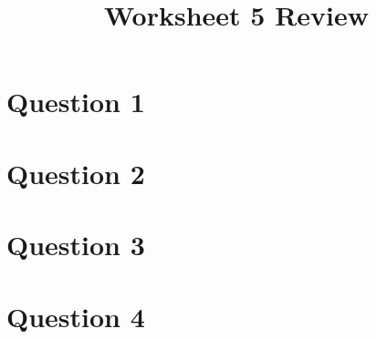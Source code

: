 \documentclass[12pt]{article}
\begin{document}
\title{Worksheet 5 Review}
\maketitle

\section*{Question 1}

\section*{Question 2}

\section*{Question 3}

\section*{Question 4}
\end{document}
